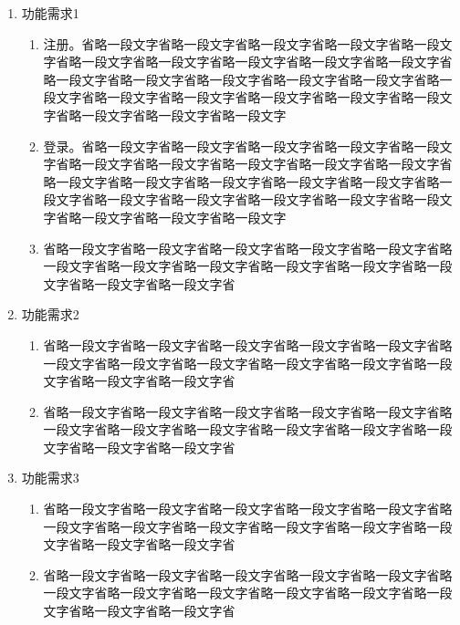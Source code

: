 	\begin{enumerate}[fullwidth,itemindent=2em,listparindent=2em]
	
    \item 功能需求1

    	\begin{enumerate}
			\item 注册。省略一段文字省略一段文字省略一段文字省略一段文字省略一段文字省略一段文字省略一段文字省略一段文字省略一段文字省略一段文字省略一段文字省略一段文字省略一段文字省略一段文字省略一段文字省略一段文字省略一段文字省略一段文字省略一段文字省略一段文字省略一段文字省略一段文字省略一段文字省略一段文字
			\item 登录。省略一段文字省略一段文字省略一段文字省略一段文字省略一段文字省略一段文字省略一段文字省略一段文字省略一段文字省略一段文字省略一段文字省略一段文字省略一段文字省略一段文字省略一段文字省略一段文字省略一段文字省略一段文字省略一段文字省略一段文字省略一段文字省略一段文字省略一段文字省略一段文字
			\item 省略一段文字省略一段文字省略一段文字省略一段文字省略一段文字省略一段文字省略一段文字省略一段文字省略一段文字省略一段文字省略一段文字省略一段文字省略一段文字省
			
		\end{enumerate}

    \item 功能需求2
    
    	\begin{enumerate}
    
    		\item 省略一段文字省略一段文字省略一段文字省略一段文字省略一段文字省略一段文字省略一段文字省略一段文字省略一段文字省略一段文字省略一段文字省略一段文字省略一段文字省

    		\item 省略一段文字省略一段文字省略一段文字省略一段文字省略一段文字省略一段文字省略一段文字省略一段文字省略一段文字省略一段文字省略一段文字省略一段文字省略一段文字省
    		
    	\end{enumerate}
    

    \item 功能需求3
   
   		\begin{enumerate}
   			\item 省略一段文字省略一段文字省略一段文字省略一段文字省略一段文字省略一段文字省略一段文字省略一段文字省略一段文字省略一段文字省略一段文字省略一段文字省略一段文字省

    		\item 省略一段文字省略一段文字省略一段文字省略一段文字省略一段文字省略一段文字省略一段文字省略一段文字省略一段文字省略一段文字省略一段文字省略一段文字省略一段文字省
   		\end{enumerate}
   


\end{enumerate}
